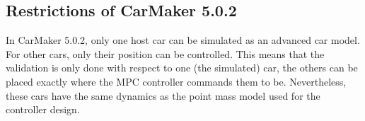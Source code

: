 \documentclass[letterpaper,10pt,conference]{ieeeconf}
\begin{document}
\subsection{Restrictions of CarMaker 5.0.2}

In CarMaker 5.0.2, only one host car can be simulated as an advanced
car model. For other cars, only their position can be controlled. This
means that the validation is only done with respect to one (the simulated) car,
the others can be placed exactly where the MPC controller commands
them to be. Nevertheless, these cars have the same dynamics as the
point mass model used for the controller design.

\end{document}
